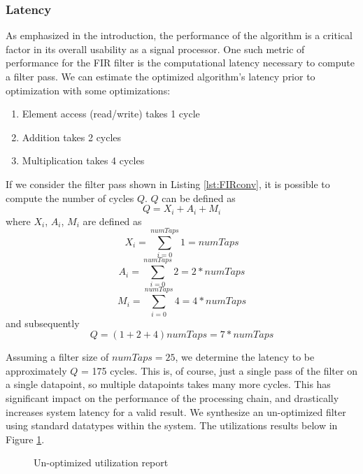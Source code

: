 \documentclass[11pt]{report}
\begin{document}
\subsubsection{Latency}
As emphasized in the introduction, the performance of the algorithm is a critical factor in its overall usability as a signal processor. One such metric of performance for the FIR filter is the computational latency necessary to compute a filter pass. We can estimate the optimized algorithm's latency prior to optimization with some optimizations:
\begin{enumerate}
	\item Element access (read/write) takes 1 cycle
	\item Addition takes 2 cycles
	\item Multiplication takes 4 cycles
\end{enumerate}
If we consider the filter pass shown in Listing \ref{lst:FIRconv}, it is possible to compute the number of cycles $Q$. $Q$ can be defined as 
\begin{equation}
	Q = X_i + A_i + M_i
\end{equation}
where $X_i$, $A_i$, $M_i$ are defined as 
\begin{equation}
	X_i = \sum_{i=0}^{numTaps} 1 = numTaps
\end{equation}
\begin{equation}
	A_i = \sum_{i=0}^{numTaps} 2 = 2 * numTaps
\end{equation}
\begin{equation}
	M_i = \sum_{i=0}^{numTaps} 4 = 4 * numTaps
\end{equation}
and subsequently 
\begin{equation}\label{FIRlatency}
	Q = (1 + 2 + 4)numTaps = 7 * numTaps
\end{equation}
 
 Assuming a filter size of $numTaps = 25$, we determine the latency to be approximately $Q$ = 175 cycles. This is, of course, just a single pass of the filter on a single datapoint, so multiple datapoints takes many more cycles. This has significant impact on the performance of the processing chain, and drastically increases system latency for a valid result. We synthesize an un-optimized filter using standard  datatypes within the system. The utilizations results below in Figure \ref{fig:unoptimizedFIRutil}. 
 
 \begin{figure}[h!]
 	\begin{center}
 		\fboxsep=0mm
 		\caption{Un-optimized utilization report}
 		\label{fig:unoptimizedFIRutil}
 	\end{center}
 \end{figure}
 \FloatBarrier
 
\end{document}
